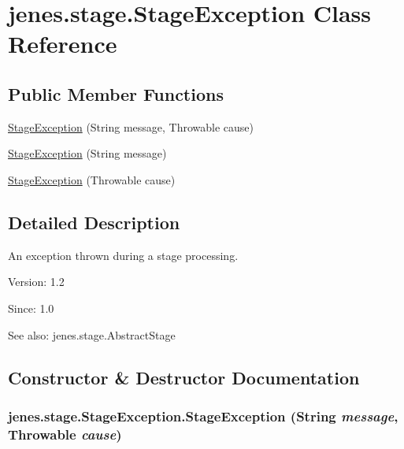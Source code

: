 \hypertarget{classjenes_1_1stage_1_1_stage_exception}{
\section{jenes.stage.StageException Class Reference}
\label{classjenes_1_1stage_1_1_stage_exception}
}
\subsection*{Public Member Functions}
\begin{CompactItemize}
\item 
\hyperlink{classjenes_1_1stage_1_1_stage_exception_4d0eb751151a2693b452176fd2fae090}{StageException} (String message, Throwable cause)
\item 
\hyperlink{classjenes_1_1stage_1_1_stage_exception_ff6f4c1b58696d6e0aae42eaa78c3506}{StageException} (String message)
\item 
\hyperlink{classjenes_1_1stage_1_1_stage_exception_b95390b5a08e2fe49d3f354204390710}{StageException} (Throwable cause)
\end{CompactItemize}


\subsection{Detailed Description}
An exception thrown during a stage processing. 

\begin{Desc}
\item[Version:]1.2 \end{Desc}
\begin{Desc}
\item[Since:]1.0\end{Desc}
\begin{Desc}
\item[See also:]jenes.stage.AbstractStage \end{Desc}


\subsection{Constructor \& Destructor Documentation}
\hypertarget{classjenes_1_1stage_1_1_stage_exception_4d0eb751151a2693b452176fd2fae090}{
\subsubsection[StageException]{\setlength{\rightskip}{0pt plus 5cm}jenes.stage.StageException.StageException (String {\em message}, \/  Throwable {\em cause})}}
\label{classjenes_1_1stage_1_1_stage_exception_4d0eb751151a2693b452176fd2fae090}


